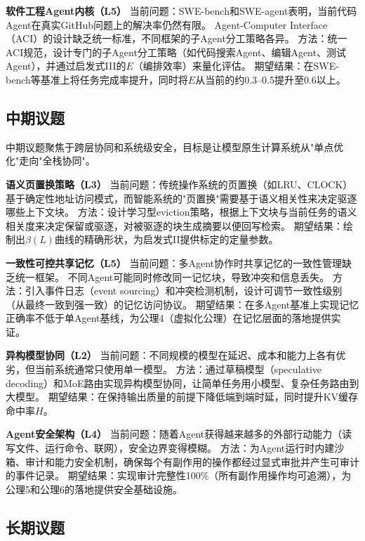 \textbf{软件工程Agent内核（L5）}
当前问题：SWE-bench和SWE-agent表明，当前代码Agent在真实GitHub问题上的解决率仍然有限\cite{swebench2023,sweagent2024}。
Agent-Computer Interface（ACI）的设计缺乏统一标准，不同框架的子Agent分工策略各异。
方法：统一ACI规范，设计专门的子Agent分工策略（如代码搜索Agent、编辑Agent、测试Agent），并通过启发式III的$E$（编排效率）来量化评估。
期望结果：在SWE-bench等基准上将任务完成率提升，同时将$E$从当前的约0.3--0.5提升至0.6以上。

\subsection{中期议题}

中期议题聚焦于跨层协同和系统级安全，目标是让模型原生计算系统从"单点优化"走向"全栈协同"。

\textbf{语义页置换策略（L3）}
当前问题：传统操作系统的页置换（如LRU、CLOCK）基于确定性地址访问模式，而智能系统的"页置换"需要基于语义相关性来决定驱逐哪些上下文块。
方法：设计学习型eviction策略，根据上下文块与当前任务的语义相关度来决定保留或驱逐，对被驱逐的块生成摘要以便回写检索。
期望结果：绘制出$\beta(L)$曲线的精确形状，为启发式II提供标定的定量参数。

\textbf{一致性可控共享记忆（L5）}
当前问题：多Agent协作时共享记忆的一致性管理缺乏统一框架。
不同Agent可能同时修改同一记忆块，导致冲突和信息丢失。
方法：引入事件日志（event sourcing）和冲突检测机制，设计可调节一致性级别（从最终一致到强一致）的记忆访问协议\cite{raft2014,cap2002}。
期望结果：在多Agent基准上实现记忆正确率不低于单Agent基线，为公理4（虚拟化公理）在记忆层面的落地提供实证。

\textbf{异构模型协同（L2）}
当前问题：不同规模的模型在延迟、成本和能力上各有优劣，但当前系统通常只使用单一模型。
方法：通过草稿模型（speculative decoding\cite{leviathan2023speculative}）和MoE路由\cite{switch2022,mixtral2024}实现异构模型协同，让简单任务用小模型、复杂任务路由到大模型。
期望结果：在保持输出质量的前提下降低端到端时延，同时提升KV缓存命中率$H$。

\textbf{Agent安全架构（L4）}
当前问题：随着Agent获得越来越多的外部行动能力（读写文件、运行命令、联网），安全边界变得模糊。
方法：为Agent运行时内建沙箱、审计和能力安全机制\cite{debenedetti2025camel,ironclaw2025,agenticsecurity2025}，确保每个有副作用的操作都经过显式审批并产生可审计的事件记录。
期望结果：实现审计完整性100\%（所有副作用操作均可追溯），为公理5和公理6的落地提供安全基础设施。

\subsection{长期议题}

